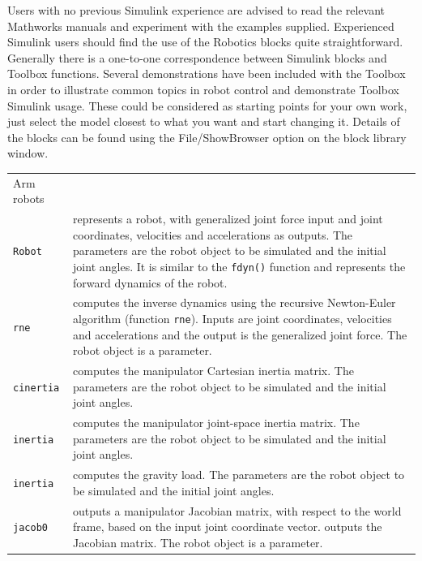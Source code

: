 \documentclass[a4paper,twoside]{report}
\begin{document}
Users with no previous Simulink experience are advised
to read the relevant Mathworks manuals and experiment with the examples 
supplied.
Experienced Simulink users should find the use of the Robotics blocks quite
straightforward.  Generally there is a one-to-one correspondence between
Simulink blocks and Toolbox functions.
Several demonstrations have been included with the Toolbox in order to 
illustrate common topics in robot control and demonstrate Toolbox Simulink 
usage.
These could be considered as starting points for your own work, just select
the model closest to what you want and start changing it.
Details of the blocks can be found using the File/ShowBrowser option on
the block library window.



\begin{longtable}{p{}p{}}

Arm robots \\
\texttt{Robot} & represents a robot,  with 
generalized joint force input and joint coordinates, velocities and
accelerations as outputs.
The parameters are the robot object
to be simulated and the initial joint angles.
It is similar to the \texttt{fdyn()}
function and represents the forward dynamics of the robot. \\

\texttt{rne} &  computes the inverse dynamics using
the recursive Newton-Euler algorithm (function \texttt{rne}).
Inputs are joint coordinates, velocities and
accelerations and the output is the generalized joint force.
The robot object is a parameter.\\

\texttt{cinertia} & computes the manipulator Cartesian inertia matrix. The parameters are the robot object
to be simulated and the initial joint angles.\\

\texttt{inertia} & computes the manipulator joint-space inertia matrix. The parameters are the robot object
to be simulated and the initial joint angles.\\

\texttt{inertia} & computes the gravity load. The parameters are the robot object
to be simulated and the initial joint angles.\\

\texttt{jacob0} & outputs a manipulator Jacobian matrix, with respect
to the world frame,  based on the
input joint coordinate vector.
outputs the Jacobian matrix.  
The robot object is a parameter.\\


\end{longtable}
\end{document}

